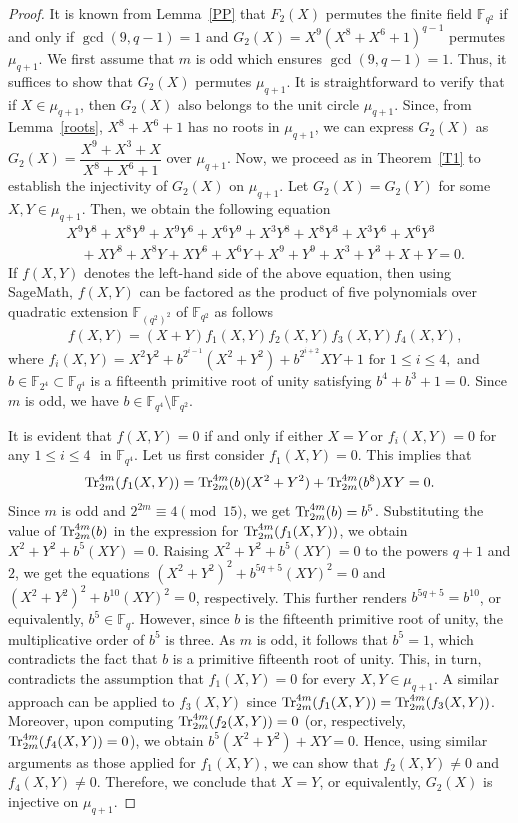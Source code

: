 \documentclass[12pt,reqno]{amsart}
\numberwithin{equation}{section}
\theoremstyle{definition}
\newcommand{\F}{\mathbb F}
\def\Tr{{\rm Tr}}
\begin{document}
\begin{proof}
It is known from Lemma~\ref{PP} that $F_2(X)$ permutes the finite field $\F_{q^2}$ if and only if $\gcd(9, q-1) = 1$ and $G_2(X)=X^{9}(X^8+X^6+1)^{q-1}$ permutes $\mu_{q+1}$. We first assume that $m$ is odd which ensures $\gcd(9, q-1)=1$. Thus, it suffices to show that $G_2(X)$ permutes $\mu_{q+1}$. It is straightforward to verify that if $X \in \mu_{q+1}$, then $G_2(X)$ also belongs to the unit circle $\mu_{q+1}$. Since, from Lemma~\ref{roots}, $X^{8}+X^{6}+1$ has no roots in $\mu_{q+1}$, we can express $G_2(X)$ as $G_2(X)=\dfrac{X^9+X^3+X}{X^8+X^6+1}$ over $\mu_{q+1}$. Now, we proceed as in Theorem~\ref{T1} to establish the injectivity of $G_2(X)$ on $\mu_{q+1}$.
Let $G_2(X) = G_2(Y)$ for some $X,Y \in \mu_{q+1}$. Then, we obtain the following equation
\begin{align*}
& X^9Y^8+X^8Y^9+X^9Y^6+X^6Y^9+X^3Y^8+X^8Y^3+X^3Y^6+X^6Y^3
\\& \quad + XY^8  +X^8Y+XY^6+X^6Y+X^9+Y^9+X^3+Y^3+X+Y=0.
\end{align*}
If $f(X, Y)$ denotes the left-hand side of the above equation, then using SageMath, $f(X,Y)$ can be factored as the product of five polynomials over quadratic extension $\F_{(q^2)^2}$ of $\F_{q^2}$ as follows
\begin{align*}
 &f(X, Y)=(X + Y)f_1(X, Y)f_2(X, Y)f_3(X, Y)f_4(X, Y), 
\end{align*}
where $f_i(X,Y)=X^2Y^2 + b^{2^{i-1}}(X^2+Y^2) + b^{2^{i+2}} XY + 1 \mbox{~for~} 1 \leq i \leq 4,$  and $b \in \F_{2^4} \subset \F_{q^4}$ is a fifteenth primitive root of unity satisfying $b^4 + b^3 + 1 = 0$. Since $m$ is odd, we have $b \in \F_{q^4} \setminus \F_{q^2}$. 

It is evident that $f(X, Y) = 0$ if and only if either $X=Y$ or $f_i(X,Y)=0$ for any $1 \leq i \leq 4$ $\text{ in } \F_{q^4}$. Let us first consider $f_1(X,Y)=0$. This implies that 
$$\Tr_{2m}^{4m}(f_1(X,Y))=\Tr_{2m}^{4m}(b)(X^2+Y^2)+\Tr_{2m}^{4m}(b^8)XY=0.$$
Since $m$ is odd and $2^{2m}\equiv4\pmod {15}$, we get $\Tr_{2m}^{4m}(b)=b^5$. Substituting the value of $\Tr_{2m}^{4m}(b)$ in the expression for $\Tr_{2m}^{4m}(f_1(X,Y))$, we obtain $X^2+Y^2+b^5(XY)=0$. Raising $X^2+Y^2+b^5(XY)=0$ to the powers $q+1$ and $2$, we get the equations $(X^2+Y^2)^2+b^{5q+5}(XY)^2=0$ and $(X^2+Y^2)^2+b^{10}(XY)^2=0$, respectively. This further renders $b^{5q+5}=b^{10}$, or equivalently, $b^5 \in \F_q$. However, since $b$ is the fifteenth primitive root of unity, the multiplicative order of $b^5$ is three. 
As $m$ is odd, it follows that $b^5 = 1$, which contradicts the fact that $b$ is a primitive fifteenth root of unity. This, in turn, contradicts the assumption that $f_1(X, Y) = 0$ for every $X, Y \in \mu_{q+1}$. A similar approach can be applied to $f_3(X,Y)$ since $\Tr_{2m}^{4m}(f_1(X,Y))=\Tr_{2m}^{4m}(f_3(X,Y))$. Moreover, upon computing $\Tr_{2m}^{4m}(f_2(X,Y))=0$ (or, respectively, $\Tr_{2m}^{4m}(f_4(X,Y))=0$), we obtain $b^5(X^2+Y^2)+XY=0$. Hence, using similar arguments as those applied for $f_1(X,Y)$, we can show that $f_2(X,Y) \ne 0$ and $f_4(X,Y) \ne 0$. Therefore, we conclude that $X=Y$, or equivalently, $G_2(X)$ is injective on $\mu_{q+1}$. 


\end{proof}
\end{document}
